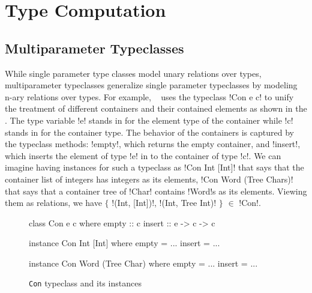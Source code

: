 \documentclass[screen,nonacm,manuscript,review]{acmart} %
\begin{document}
\section{Type Computation}\label{sec:type-computation}
\subsection{Multiparameter Typeclasses}\label{sec:multiparam-typeclasses}
While single parameter type classes model unary
relations over types, multiparameter typeclasses generalize single
parameter typeclasses by modeling n-ary relations
over types. For example, ~\citet{jones_tcfd_2000} uses the
typeclass !Con e c! to unify the treatment of
different containers and their contained elements as shown in
the . The type variable !e! stands in for the
element type of the container while !c! stands in for the container
type. The behavior of the containers is captured by the typeclass methods:
!empty!, which returns the empty container, and !insert!,
which inserts the element of type !e! in to the container of type !c!.
We can imagine having instances for such a typeclass as
!Con Int [Int]! that says that the container list of integers has
integers as its elements, !Con Word (Tree Chars)! that says that a
container tree of !Char! contains !Word!s as its
elements. Viewing them as relations,
we have $\{$ !(Int, [Int])!, !(Int, Tree Int)! $\}$ $\in$ !Con!.

\begin{figure}[ht]
\centering
\begin{minipage}[ht]{0.3\linewidth}
\begin{CenteredBox}
\begin{code}
class Con e c
where
  empty :: c
  insert :: e -> c -> c
\end{code}
\end{CenteredBox}
\end{minipage}%
\begin{minipage}[ht]{0.3\linewidth}
\begin{CenteredBox}
\begin{code}
instance Con Int [Int]
where
  empty = ...
  insert = ...
\end{code}
\end{CenteredBox}
\end{minipage}%
\begin{minipage}[ht]{0.3\linewidth}
\begin{CenteredBox}
\begin{code}
instance Con Word (Tree Char)
where
  empty = ...
  insert = ...
\end{code}
\end{CenteredBox}
\end{minipage}
\caption[\lstinline{Con} typeclass]{\lstinline{Con} typeclass and its instances}
\label{fig:tc-collection}
\end{figure}
\end{document}
